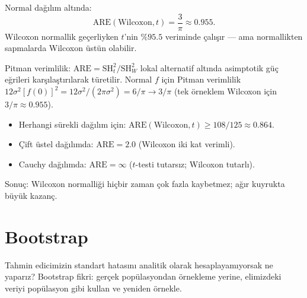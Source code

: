 \begin{teorem}\label{thm:are_wilcoxon}
Normal dağılım altında:
\[
  \mathrm{ARE}(\text{Wilcoxon},t) = \frac{3}{\pi} \approx 0.955.
\]
Wilcoxon normallik geçerliyken $t$'nin $\%95.5$ veriminde çalışır --- ama normallikten sapmalarda Wilcoxon üstün olabilir.
\end{teorem}

\begin{ispatiskele}
Pitman verimlilik: $\mathrm{ARE}=\mathrm{SH}^2_{t}/\mathrm{SH}^2_W$ lokal alternatif altında asimptotik güç eğrileri karşılaştırılarak türetilir. Normal $f$ için Pitman verimlilik $12\sigma^2[f(0)]^2 = 12\sigma^2 /(2\pi\sigma^2)=6/\pi\to3/\pi$ (tek örneklem Wilcoxon için $3/\pi\approx0.955$).
\end{ispatiskele}

\begin{teorem}
\begin{itemize}
  \item Herhangi sürekli dağılım için: $\mathrm{ARE}(\text{Wilcoxon},t)\geq108/125\approx0.864$.
  \item Çift üstel dağılımda: $\mathrm{ARE}=2.0$ (Wilcoxon iki kat verimli).
  \item Cauchy dağılımda: $\mathrm{ARE}=\infty$ ($t$-testi tutarsız; Wilcoxon tutarlı).
\end{itemize}
Sonuç: Wilcoxon normalliği hiçbir zaman çok fazla kaybetmez; ağır kuyrukta büyük kazanç.
\end{teorem}

\section{Bootstrap}
\label{sec:bootstrap}

\begin{kesif}
Tahmin edicimizin standart hatasını analitik olarak hesaplayamıyorsak ne yaparız? Bootstrap fikri: gerçek popülasyondan örnekleme yerine, elimizdeki veriyi popülasyon gibi kullan ve yeniden örnekle.
\end{kesif}

